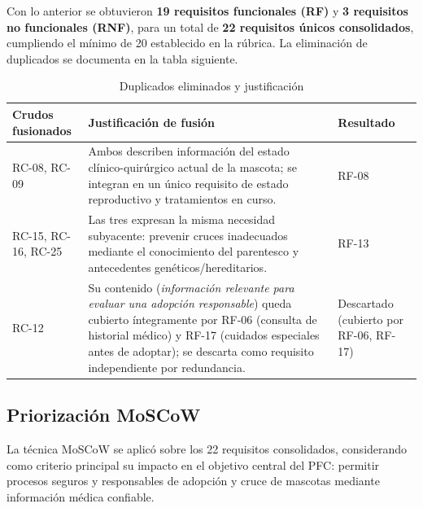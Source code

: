 Con lo anterior se obtuvieron \textbf{19 requisitos funcionales (RF)} y \textbf{3 requisitos no funcionales (RNF)}, para un total de \textbf{22 requisitos únicos consolidados}, cumpliendo el mínimo de 20 establecido en la rúbrica. La eliminación de duplicados se documenta en la tabla siguiente.

\begin{table}[H]
	\centering
	\caption{Duplicados eliminados y justificación}
	\label{tab:duplicados}
	\begin{tabular}{|p{2.8cm}|p{9.5cm}|p{2.2cm}|}
		\hline
		\textbf{Crudos fusionados} & \textbf{Justificación de fusión} & \textbf{Resultado} \\ \hline
		RC-08, RC-09 & Ambos describen información del estado clínico-quirúrgico actual de la mascota; se integran en un único requisito de estado reproductivo y tratamientos en curso. & RF-08 \\ \hline
		RC-15, RC-16, RC-25 & Las tres expresan la misma necesidad subyacente: prevenir cruces inadecuados mediante el conocimiento del parentesco y antecedentes genéticos/hereditarios. & RF-13 \\ \hline
		RC-12 & Su contenido (\textit{información relevante para evaluar una adopción responsable}) queda cubierto íntegramente por RF-06 (consulta de historial médico) y RF-17 (cuidados especiales antes de adoptar); se descarta como requisito independiente por redundancia. & Descartado (cubierto por RF-06, RF-17) \\ \hline
	\end{tabular}
\end{table}

\subsection{Priorización MoSCoW}

La técnica MoSCoW \cite{moscow_kano} se aplicó sobre los 22 requisitos consolidados, considerando como criterio principal su impacto en el objetivo central del PFC: permitir procesos seguros y responsables de adopción y cruce de mascotas mediante información médica confiable.

